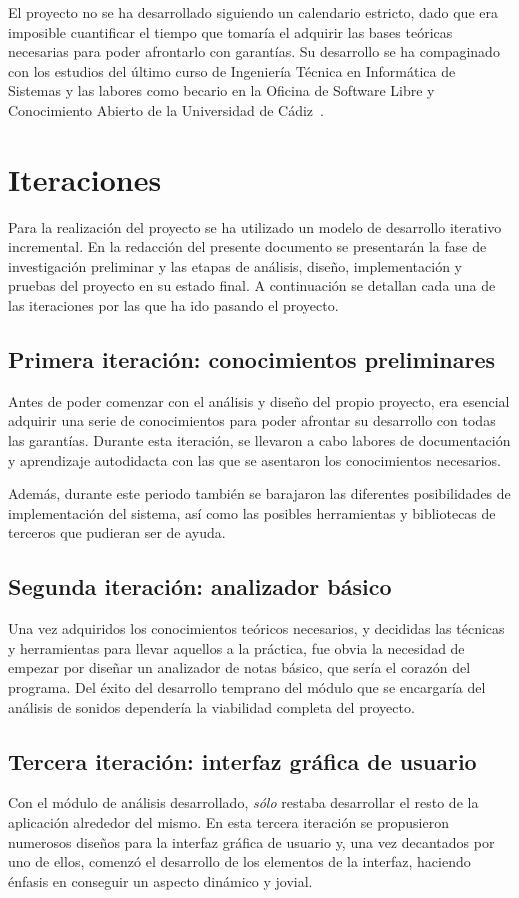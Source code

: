 El proyecto no se ha desarrollado siguiendo un calendario estricto,
dado que era imposible cuantificar el tiempo que tomaría el adquirir
las bases teóricas necesarias para poder afrontarlo con garantías. Su
desarrollo se ha compaginado con los estudios del último curso de
Ingeniería Técnica en Informática de Sistemas y las labores como
becario en la Oficina de Software Libre y Conocimiento Abierto de la
Universidad de Cádiz~\cite{osluca}.

\section{Iteraciones}
Para la realización del proyecto se ha utilizado un modelo de desarrollo
iterativo incremental. En la redacción del presente documento se presentarán la
fase de investigación preliminar y las etapas de análisis, diseño,
implementación y pruebas del proyecto en su estado final. A continuación se
detallan cada una de las iteraciones por las que ha ido pasando el proyecto.

\subsection{Primera iteración: conocimientos preliminares}
Antes de poder comenzar con el análisis y diseño del propio proyecto,
era esencial adquirir una serie de conocimientos para poder afrontar
su desarrollo con todas las garantías. Durante esta iteración, se
llevaron a cabo labores de documentación y aprendizaje autodidacta con
las que se asentaron los conocimientos necesarios.

Además, durante este periodo también se barajaron las diferentes
posibilidades de implementación del sistema, así como las posibles
herramientas y bibliotecas de terceros que pudieran ser de ayuda.

\subsection{Segunda iteración: analizador básico}
Una vez adquiridos los conocimientos teóricos necesarios, y decididas
las técnicas y herramientas para llevar aquellos a la práctica, fue
obvia la necesidad de empezar por diseñar un analizador de notas
básico, que sería el corazón del programa. Del éxito del desarrollo
temprano del módulo que se encargaría del análisis de sonidos
dependería la viabilidad completa del proyecto.

\subsection{Tercera iteración: interfaz gráfica de usuario}
Con el módulo de análisis desarrollado, \textit{sólo} restaba
desarrollar el resto de la aplicación alrededor del mismo. En esta
tercera iteración se propusieron numerosos diseños para la interfaz
gráfica de usuario y, una vez decantados por uno de ellos, comenzó el
desarrollo de los elementos de la interfaz, haciendo énfasis en
conseguir un aspecto dinámico y jovial.


